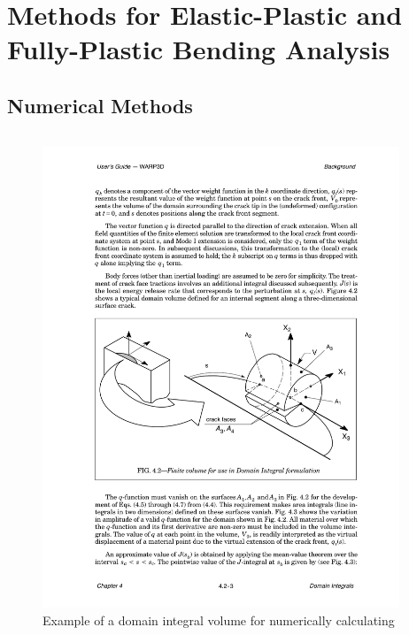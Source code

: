 \section[Methods for EP and FP Bending Analysis]{Methods for Elastic-Plastic and Fully-Plastic Bending Analysis}

\subsection{Numerical Methods}

\begin{frame}
\begin{columns}
\begin{column}{0.45\textwidth}
\begin{figure}[tbp]
\centering
\includegraphics[width=\columnwidth]{domain-integral-volume}
\caption{Example of a domain integral volume for numerically calculating \J}
\end{figure}
\end{column}
\begin{column}{0.45\textwidth}

\end{column}
\end{columns}
\end{frame}
